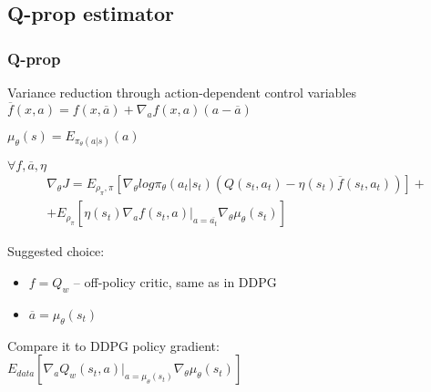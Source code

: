 \documentclass{beamer}
\begin{document}
\subsection{Q-prop estimator}

\begin{frame}[t]
\frametitle{Q-prop}
Variance reduction through action-dependent control variables\\
 
$\overline{f} (x,a) = f(x,\overline{a}) + \nabla_a f(x, a) (a - \overline{a})$

$\mu_\theta(s) = E_{\pi_\theta(a|s)} (a)$

\begin{theorem}
$\forall f, \overline{a}, \eta$
\begin{multline}
\nabla_{\theta} J = E_{\rho_\pi, \pi} \left[ \nabla_{\theta} log \pi_\theta ( a_t | s_t) (Q(s_t, a_t) - \eta(s_t) \overline{f} (s_t,a_t)) \right] + \\ + E_{\rho_\pi} \left[ \eta(s_t) \nabla_a f(s_t, a) |_{a=\overline{a_t}} 
\nabla_\theta \mu_\theta(s_t)
\right]
\end{multline} 
\end{theorem}

Suggested choice: 
\begin{itemize}
\item $f = Q_w$ -- off-policy critic, same as in DDPG
\item $\overline{a} = \mu_\theta(s_t)$
\end{itemize}

Compare it to DDPG policy gradient:
\\$E_{data} \left[ \nabla_a Q_w (s_t, a) |_{a=\mu_\theta(s_t)} 
\nabla_\theta \mu_\theta(s_t) \right]$

\end{frame}
\end{document}
